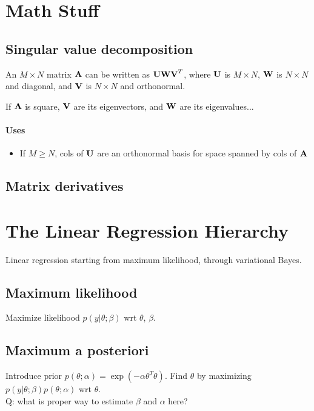 \documentclass[11pt]{article}
\begin{document}
\newpage
\begin{appendices}
\section{Math Stuff}
\subsection{Singular value decomposition}
\label{subsec:SVD}
An $M \times N$ matrix $\textbf{A}$ can be written as $\textbf{U}\textbf{W}\textbf{V}^T$,
where $\textbf{U}$ is $M \times N$, $\textbf{W}$ is $N \times N$ and diagonal, and
$\textbf{V}$ is $N \times N$ and orthonormal.

If $\textbf{A}$ is square, $\textbf{V}$ are its eigenvectors, and $\textbf{W}$
are its eigenvalues...

\paragraph{Uses}
\begin{itemize}
  \item If $M \geq N$, cols of $\textbf{U}$ are an orthonormal basis for space
  spanned by cols of $\textbf{A}$
\end{itemize}

\TODOFIN{}

\subsection{Matrix derivatives}



\section{The Linear Regression Hierarchy}
Linear regression starting from maximum likelihood, through variational Bayes.
\subsection{Maximum likelihood}
Maximize likelihood $p(y | \theta ; \beta)$ wrt $\theta$, $\beta$.

\subsection{Maximum a posteriori}
Introduce prior $p(\theta ; \alpha) = \exp(-\alpha \theta^T \theta)$. Find
$\theta$ by maximizing $p(y | \theta ; \beta) p(\theta ; \alpha)$ wrt $\theta$.
\\
Q: what is proper way to estimate $\beta$ and $\alpha$ here?


\end{appendices}
\end{document}
